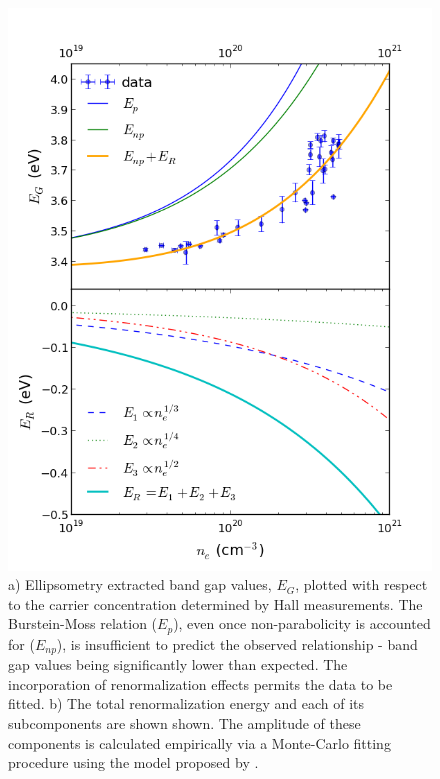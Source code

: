 \documentclass[preprint]{elsarticle}
\begin{document}
\begin{figure}[p]
\centering
\includegraphics[scale=0.5]{figure5_b.png}
\caption{\label{fig:4} a) Ellipsometry extracted band gap values, $E_G$, plotted with respect to the carrier concentration determined by Hall measurements. The Burstein-Moss relation ($E_p$), even once non-parabolicity is accounted for ($E_{np}$), is insufficient to predict the observed relationship - band gap values being significantly lower than expected. The incorporation of renormalization effects permits the data to be fitted. b) The total renormalization energy and each of its subcomponents are shown shown. The amplitude of these components is calculated empirically via a Monte-Carlo fitting procedure using the model proposed by \cite{Jain1990}. }
\end{figure}
\end{document}
